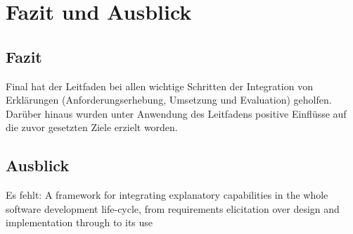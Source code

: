 \chapter{Fazit und Ausblick}

\section{Fazit}






Final hat der Leitfaden bei allen wichtige Schritten der Integration von Erklärungen (Anforderungserhebung, Umsetzung und Evaluation) geholfen. Darüber hinaus wurden unter Anwendung des Leitfadens positive Einflüsse auf die zuvor gesetzten Ziele erzielt worden. 

\section{Ausblick}



Es fehlt: A framework for integrating explanatory capabilities in the whole software development life-cycle, from requirements elicitation over design and implementation through to its use \cite{cassens_ambient_2019}

